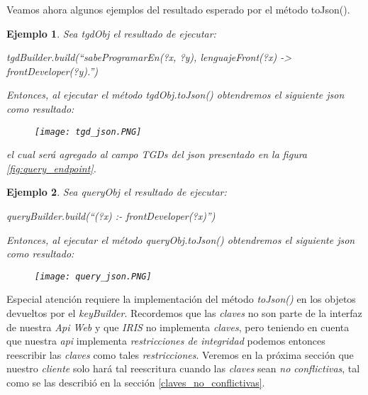 \documentclass[11pt,a4paper,twoside]{tesis}
\newtheorem{exmp}{Ejemplo}
\begin{document}
Veamos ahora algunos ejemplos del resultado esperado por el método toJson().

\begin{exmp}
Sea \textit{tgdObj} el resultado de ejecutar:

\begin{center}
   \textit{tgdBuilder.build(``sabeProgramarEn(?x, ?y), lenguajeFront(?x) ->  frontDeveloper(?y).'')} 
\end{center}

Entonces, al ejecutar el método \textit{tgdObj.toJson()} obtendremos el siguiente \textit{json} como resultado:


\begin{figure}[ht]
    \texttt{[image: tgd\_json.PNG]}
    \centering
\end{figure}


el cual será agregado al campo \textit{TGDs} del \textit{json} presentado en la figura \ref{fig:query_endpoint}.

\end{exmp}

\begin{exmp}
Sea \textit{queryObj} el resultado de ejecutar:

\begin{center}
   \textit{queryBuilder.build(``(?x) :- frontDeveloper(?x)'')} 
\end{center}

Entonces, al ejecutar el método \textit{queryObj.toJson()} obtendremos el siguiente \textit{json} como resultado:


\begin{figure}[ht]
    \texttt{[image: query\_json.PNG]}
    \centering
\end{figure}
\end{exmp}

Especial atención requiere la implementación del método \textit{toJson()} en los objetos devueltos por el \textit{keyBuilder}. Recordemos que las \textit{claves} no son parte de la interfaz de nuestra \textit{Api Web} y que \textit{IRIS} no implementa \textit{claves}, pero teniendo en cuenta que nuestra \textit{api} implementa \textit{restricciones de integridad} podemos entonces reescribir las \textit{claves} como tales \textit{restricciones}. Veremos en la próxima sección que nuestro \textit{cliente} solo hará tal reescritura cuando las \textit{claves} sean \textit{no conflictivas}, tal como se las describió en la sección \ref{claves_no_conflictivas}. 
\end{document}
